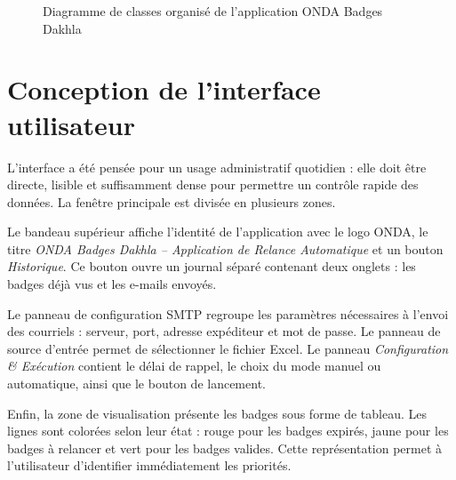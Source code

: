 \documentclass[12pt,a4paper,openany]{report}
\begin{document}
\begin{figure}[H]
{%
}

\caption{Diagramme de classes organisé de l'application ONDA Badges Dakhla}
\label{fig:diagramme-classes}
\end{figure}

\section{Conception de l'interface utilisateur}

L'interface a été pensée pour un usage administratif quotidien : elle doit être
directe, lisible et suffisamment dense pour permettre un contrôle rapide des
données. La fenêtre principale est divisée en plusieurs zones.

Le bandeau supérieur affiche l'identité de l'application avec le logo ONDA, le
titre \textit{ONDA Badges Dakhla -- Application de Relance Automatique} et un
bouton \textit{Historique}. Ce bouton ouvre un journal séparé contenant deux
onglets : les badges déjà vus et les e-mails envoyés.

Le panneau de configuration SMTP regroupe les paramètres nécessaires à l'envoi
des courriels : serveur, port, adresse expéditeur et mot de passe. Le panneau de
source d'entrée permet de sélectionner le fichier Excel. Le panneau
\textit{Configuration \& Exécution} contient le délai de rappel, le choix du mode
manuel ou automatique, ainsi que le bouton de lancement.

Enfin, la zone de visualisation présente les badges sous forme de tableau. Les
lignes sont colorées selon leur état : rouge pour les badges expirés, jaune pour
les badges à relancer et vert pour les badges valides. Cette représentation
permet à l'utilisateur d'identifier immédiatement les priorités.
\end{document}
